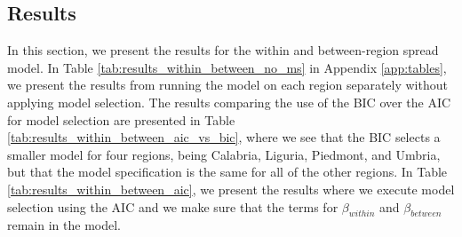 \documentclass[12pt]{article}
\begin{document}
	\subsection{Results} \label{subsec:model_within_between_results}
	In this section, we present the results for the within and between-region spread model. In Table \ref{tab:results_within_between_no_ms} in Appendix \ref{app:tables}, we present the results from running the model on each region separately without applying model selection. The results comparing the use of the BIC over the AIC for model selection are presented in Table \ref{tab:results_within_between_aic_vs_bic}, where we see that the BIC selects a smaller model for four regions, being Calabria, Liguria, Piedmont, and Umbria, but that the model specification is the same for all of the other regions. In Table \ref{tab:results_within_between_aic}, we present the results where we execute model selection using the AIC and we make sure that the terms for $\beta_{within}$ and $\beta_{between}$ remain in the model. \\
	
\end{document}
